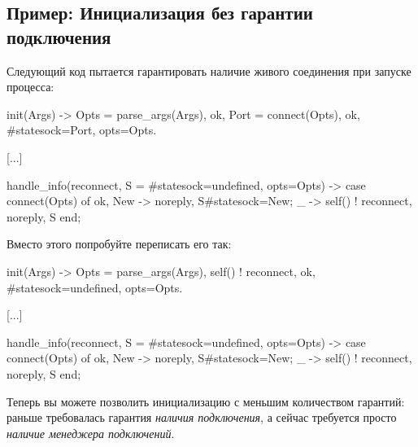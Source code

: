 \documentclass[11pt, oneside]{book}   	%
\begin{document}
\subsection{Пример: Инициализация без гарантии подключения}
\label{subsec:start-link-initializing-without-guaranteeing-connections}

Следующий код пытается гарантировать наличие живого соединения при запуске процесса:

\begin{VerbatimText}
init(Args) ->
    Opts = parse_args(Args),
    {ok, Port} = connect(Opts),
    {ok, #state{sock=Port, opts=Opts}}.

[...]

handle_info(reconnect, S = #state{sock=undefined, opts=Opts}) ->
    case connect(Opts) of
        {ok, New} -> {noreply, S#state{sock=New}};
         _ -> self() ! reconnect, {noreply, S}
    end;
\end{VerbatimText}

Вместо этого попробуйте переписать его так:

\begin{VerbatimText}
init(Args) ->
    Opts = parse_args(Args),
    self() ! reconnect,
    {ok, #state{sock=undefined, opts=Opts}}.

[...]

handle_info(reconnect, S = #state{sock=undefined, opts=Opts}) ->
    case connect(Opts) of
        {ok, New} -> {noreply, S#state{sock=New}};
        _ -> self() ! reconnect, {noreply, S}
    end;
\end{VerbatimText}

\sloppy{}
Теперь вы можете позволить инициализацию с меньшим количеством гарантий: раньше требовалась гарантия \emph{наличия подключения}, а сейчас требуется просто \emph{наличие менеджера подключений}.
\end{document}
